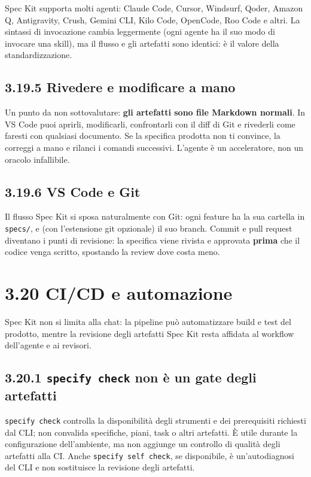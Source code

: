 \documentclass[
  italian,
  10pt,
]{book}
\begin{document}
Spec Kit supporta molti agenti: Claude Code, Cursor, Windsurf, Qoder,
Amazon Q, Antigravity, Crush, Gemini CLI, Kilo Code, OpenCode, Roo Code
e altri. La sintassi di invocazione cambia leggermente (ogni agente ha
il suo modo di invocare una skill), ma il flusso e gli artefatti sono
identici: è il valore della standardizzazione.

\subsection{3.19.5 Rivedere e modificare a
mano}\label{rivedere-e-modificare-a-mano}

Un punto da non sottovalutare: \textbf{gli artefatti sono file Markdown
normali}. In VS Code puoi aprirli, modificarli, confrontarli con il diff
di Git e rivederli come faresti con qualsiasi documento. Se la specifica
prodotta non ti convince, la correggi a mano e rilanci i comandi
successivi. L'agente è un acceleratore, non un oracolo infallibile.

\subsection{3.19.6 VS Code e Git}\label{vs-code-e-git}

Il flusso Spec Kit si sposa naturalmente con Git: ogni feature ha la sua
cartella in \texttt{specs/}, e (con l'estensione git opzionale) il suo
branch. Commit e pull request diventano i punti di revisione: la
specifica viene rivista e approvata \textbf{prima} che il codice venga
scritto, spostando la review dove costa meno.

\section{3.20 CI/CD e automazione}\label{cicd-e-automazione}

Spec Kit non si limita alla chat: la pipeline può automatizzare build e
test del prodotto, mentre la revisione degli artefatti Spec Kit resta
affidata al workflow dell'agente e ai revisori.

\subsection{\texorpdfstring{3.20.1 \texttt{specify\ check} non è un gate
degli
artefatti}{3.20.1 specify check non è un gate degli artefatti}}\label{specify-check-non-uxe8-un-gate-degli-artefatti}

\texttt{specify\ check} controlla la disponibilità degli strumenti e dei
prerequisiti richiesti dal CLI; non convalida specifiche, piani, task o
altri artefatti. È utile durante la configurazione dell'ambiente, ma non
aggiunge un controllo di qualità degli artefatti alla CI. Anche
\texttt{specify\ self\ check}, se disponibile, è un'autodiagnosi del CLI
e non sostituisce la revisione degli artefatti.
\end{document}
